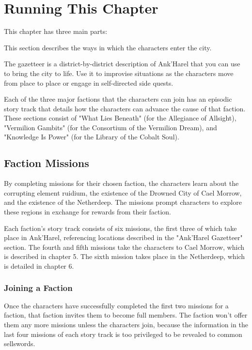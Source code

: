 \documentclass[10pt,a4paper,twoside,twocolumn,openany,nodeprecatedcode]{dndbook}
\begin{document}
\section{Running This Chapter}
This chapter has three main parts:

\begin{description}[nolistsep]

\item[Arrival in Ank'Harel.]
This section describes the ways in which the characters enter the city.

\item[Ank'Harel Gazetteer.]
The gazetteer is a district-by-district description of Ank'Harel that you can use to bring the city to life. Use it to improvise situations as the characters move from place to place or engage in self-directed side quests.

\item[Faction Story Tracks.]
Each of the three major factions that the characters can join has an episodic story track that details how the characters can advance the cause of that faction. These sections consist of "What Lies Beneath" (for the Allegiance of Allsight), "Vermilion Gambits" (for the Consortium of the Vermilion Dream), and "Knowledge Is Power" (for the Library of the Cobalt Soul).
\end{description}

\subsection{Faction Missions}
By completing missions for their chosen faction, the characters learn about the corrupting element ruidium, the existence of the Drowned City of Cael Morrow, and the existence of the Netherdeep. The missions prompt characters to explore these regions in exchange for rewards from their faction.

Each faction's story track consists of six missions, the first three of which take place in Ank'Harel, referencing locations described in the "Ank'Harel Gazetteer" section. The fourth and fifth missions take the characters to Cael Morrow, which is described in chapter 5. The sixth mission takes place in the Netherdeep, which is detailed in chapter 6.

\subsubsection{Joining a Faction}
Once the characters have successfully completed the first two missions for a faction, that faction invites them to become full members. The faction won't offer them any more missions unless the characters join, because the information in the last four missions of each story track is too privileged to be revealed to common sellswords.
\end{document}
